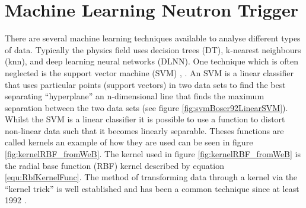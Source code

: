 \section{Machine Learning Neutron Trigger}\label{sec:MachineLearningTrigger}
There are several machine learning techniques available to analyse different types of data. Typically the physics field uses decision trees (DT), k-nearest neighbours (knn), and deep learning neural networks (DLNN). One technique which is often neglected is the support vector machine (SVM) \cite{Boser92atraining}, \cite{cortes1995support}. An SVM is a linear classifier that uses particular points (support vectors) in two data sets to find the best separating ``hyperplane'' an n-dimensional line that finds the maximum separation between the two data sets (see figure \ref{fig:svmBoser92LinearSVM}). Whilst the SVM is a linear classifier it is possible to use a function to distort non-linear data such that it becomes linearly separable. Theses functions are called kernels an example of how they are used can be seen in figure \ref{fig:kernelRBF_fromWeB}. The kernel used in figure \ref{fig:kernelRBF_fromWeB} is the radial base function (RBF) kernel described by equation \ref{equ:RbfKernelFunc}. The method of transforming data through a kernel via the ``kernel trick'' is well established and has been a common technique since at least 1992 \cite{Boser92atraining}.
